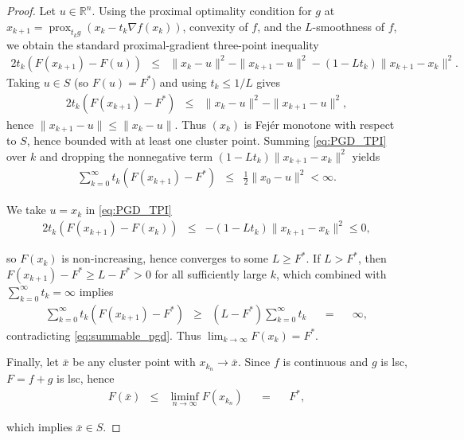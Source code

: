 \documentclass[10pt,a4paper]{amsart}
\newcommand{\amp}{\mathop{\:\:\,}\nolimits}
\newcommand{\prox}{\operatorname{prox}}
\begin{document}
\begin{proof}
Let $u\in\mathbb{R}^n$. Using the proximal optimality condition for $g$ at
$x_{k+1}=\prox_{t_k g}(x_k-t_k\nabla f(x_k))$, convexity of $f$, and the $L$-smoothness of $f$,
we obtain the standard proximal-gradient three-point inequality
\begin{eqnarray}\label{eq:PGD_TPI}
    2t_k(F(x_{k+1}) - F(u))
    &\leq & \|x_k-u\|^2 - \|x_{k+1}-u\|^2 - (1-Lt_k)\|x_{k+1}-x_k\|^2 .
\end{eqnarray}
Taking $u \in S$ (so $F(u)=F^*$) and using $t_k\le 1/L$ gives
\begin{eqnarray}
2t_k(F(x_{k+1})-F^*) &\le& \|x_k-u\|^2-\|x_{k+1}-u\|^2,
\end{eqnarray}
hence $\|x_{k+1}-u\|\le \|x_k-u\|$. Thus $(x_k)$ is Fej\'er monotone with respect to $S$,
hence bounded with at least one cluster point. Summing \eqref{eq:PGD_TPI} over $k$ and dropping the
nonnegative term $(1-Lt_k)\|x_{k+1}-x_k\|^2$ yields
\begin{eqnarray}\label{eq:summable_pgd}
    \sum_{k=0}^{\infty} t_k(F(x_{k+1}) - F^*) &\leq& \frac{1}{2}\|x_0-u\|^2 < \infty.
\end{eqnarray}

We take $u=x_k$ in \eqref{eq:PGD_TPI} 
\begin{eqnarray}
    2t_k(F(x_{k+1})-F(x_k)) &\le& -(1-Lt_k)\|x_{k+1}-x_k\|^2 \le 0,
\end{eqnarray}

so $F(x_k)$ is non-increasing, hence converges to some $L \geq F^*$. If $L > F^*$, then
$F(x_{k+1}) - F^* \geq L - F^* > 0$ for all sufficiently large $k$, which combined with
$\sum_{k=0}^\infty t_k=\infty$ implies
\begin{eqnarray}
\sum_{k=0}^{\infty} t_k(F(x_{k+1}) - F^*) &\geq& (L-F^*)\sum_{k=0}^{\infty} t_k \amp=\amp \infty,
\end{eqnarray}
contradicting \eqref{eq:summable_pgd}. Thus $\lim_{k \to \infty} F(x_k) = F^*$.

Finally, let $\bar{x}$ be any cluster point with $x_{k_n} \to \bar{x}$. Since $f$ is continuous and
$g$ is lsc, $F=f+g$ is lsc, hence
\begin{eqnarray}
    F(\bar{x}) &\leq& \liminf_{n \to \infty} F(x_{k_n}) \amp=\amp F^*,
\end{eqnarray}

which implies $\bar{x} \in S$.
\end{proof}
\end{document}
